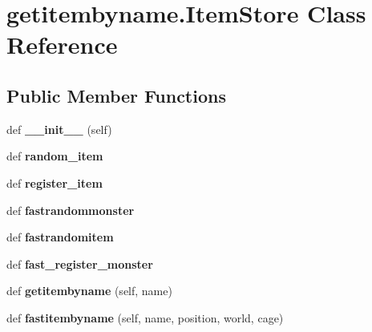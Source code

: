 \hypertarget{classgetitembyname_1_1_item_store}{}\section{getitembyname.\+Item\+Store Class Reference}
\label{classgetitembyname_1_1_item_store}
\subsection*{Public Member Functions}
\begin{DoxyCompactItemize}
\item 
\hypertarget{classgetitembyname_1_1_item_store_a0443f6897f469497d3d32bdcc83c2a1c}{}def {\bfseries \+\_\+\+\_\+init\+\_\+\+\_\+} (self)\label{classgetitembyname_1_1_item_store_a0443f6897f469497d3d32bdcc83c2a1c}

\item 
\hypertarget{classgetitembyname_1_1_item_store_a7d3e1f56ee0be4f52e181cffa1b2f268}{}def {\bfseries random\+\_\+item}\label{classgetitembyname_1_1_item_store_a7d3e1f56ee0be4f52e181cffa1b2f268}

\item 
\hypertarget{classgetitembyname_1_1_item_store_aab05f3c2be6cef9dec77174d5b97a0ff}{}def {\bfseries register\+\_\+item}\label{classgetitembyname_1_1_item_store_aab05f3c2be6cef9dec77174d5b97a0ff}

\item 
\hypertarget{classgetitembyname_1_1_item_store_aef2cb11f17d1424be52adc1e2108c420}{}def {\bfseries fastrandommonster}\label{classgetitembyname_1_1_item_store_aef2cb11f17d1424be52adc1e2108c420}

\item 
\hypertarget{classgetitembyname_1_1_item_store_a915d19811424d77b59647e9f4d473399}{}def {\bfseries fastrandomitem}\label{classgetitembyname_1_1_item_store_a915d19811424d77b59647e9f4d473399}

\item 
\hypertarget{classgetitembyname_1_1_item_store_adac65334ac2ef07cc5a18d9dc0b821b3}{}def {\bfseries fast\+\_\+register\+\_\+monster}\label{classgetitembyname_1_1_item_store_adac65334ac2ef07cc5a18d9dc0b821b3}

\item 
\hypertarget{classgetitembyname_1_1_item_store_a19e7063455b6619250beba1a18c491a6}{}def {\bfseries getitembyname} (self, name)\label{classgetitembyname_1_1_item_store_a19e7063455b6619250beba1a18c491a6}

\item 
\hypertarget{classgetitembyname_1_1_item_store_a22167f44c3ba6a03338cc8290904d524}{}def {\bfseries fastitembyname} (self, name, position, world, cage)\label{classgetitembyname_1_1_item_store_a22167f44c3ba6a03338cc8290904d524}

\end{DoxyCompactItemize}
